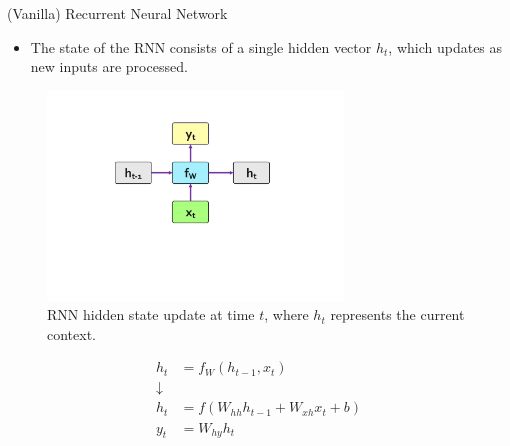 \documentclass[serif, aspectratio=169]{beamer}
\begin{document}
\begin{frame}{(Vanilla) Recurrent Neural Network}
	\begin{itemize}
		\item The state of the RNN consists of a single hidden vector \( h_t \), which updates as new inputs are processed.
	\end{itemize}
	\vspace{-35pt}
	\begin{figure}
		\includegraphics[width=0.7\textwidth]{pic/RNN-final.png}
		\caption{RNN hidden state update at time \( t \), where \( h_t \) represents the current context.}
	\end{figure}
	\vspace{-100pt}
	\begin{align*}
		h_t &= f_W(h_{t-1}, x_t) \\ 
		\downarrow \\
		h_t &= f(W_{hh} h_{t-1} + W_{xh} x_t + b) \\ 
		y_t &= W_{hy} h_t
	\end{align*}
\end{frame}
\end{document}
